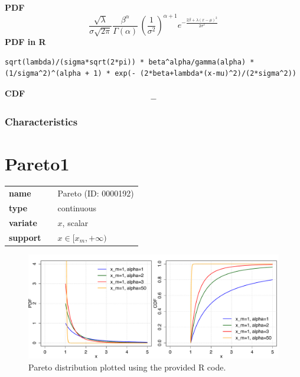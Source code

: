 \smallskip \noindent \hspace{.2cm} \textbf{PDF} 
\begin{equation*}\frac {\sqrt{\lambda}} {\sigma\sqrt{2\pi} }  \frac{\beta^\alpha}{\Gamma(\alpha)} \, \left( \frac{1}{\sigma^2} \right)^{\alpha + 1}   e^{ -\frac { 2\beta + \lambda(x - \mu)^2} {2\sigma^2}  } \end{equation*}
\smallskip \noindent \hspace{.2cm} \textbf{PDF in R}  
\begin{verbatim}sqrt(lambda)/(sigma*sqrt(2*pi)) * beta^alpha/gamma(alpha) * (1/sigma^2)^(alpha + 1) * exp(- (2*beta+lambda*(x-mu)^2)/(2*sigma^2))\end{verbatim}
\smallskip \noindent \hspace{.2cm} \textbf{CDF} 
\begin{equation*}-\end{equation*}
\smallskip
\subsubsection*{Characteristics}
\smallskip
\section*{Pareto1} 

  \bigskip 

\begin{tabular}{p{2cm}cl}
\textbf{name} & & Pareto (ID: 0000192)\\ 
 
\textbf{type} & & continuous \\ 

\textbf{variate} & & $x$, scalar \\ 

\textbf{support} & & $x \in [x_m, +\infty)$
\end{tabular}

\begin{figure}[ht!]
\centering
  \includegraphics[width=140mm]{pics/Pareto.pdf}
 \caption{Pareto distribution plotted using the provided R code.}
 \label{fig:Pareto}
\end{figure}

